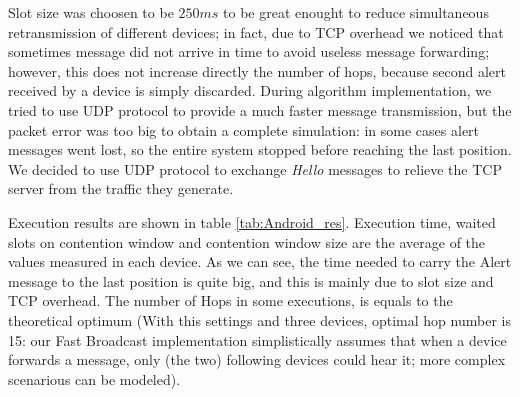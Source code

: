 Slot size was choosen to be $250ms$ to be great enought to reduce simultaneous retransmission of different devices; in fact, due to TCP overhead we noticed that sometimes message did not arrive in time to avoid useless message forwarding; however, this does not increase directly the number of hops, because second alert received by a device is simply discarded. 
During algorithm implementation, we tried to use UDP protocol to provide a much faster message transmission, but the packet error was too big to obtain a complete simulation: in some cases alert messages went lost, so the entire system stopped before reaching the last position. We decided to use UDP protocol to exchange \textit{Hello} messages to relieve the TCP server from the traffic they generate.

Execution results are shown in table \ref{tab:Android_res}. Execution time, waited slots on contention window and contention window size are the average of the values measured in each device. As we can see, the time needed to carry the Alert message to the last position is quite big, and this is mainly due to slot size and TCP overhead. The number of Hops in some executions, is equals to the theoretical optimum (With this settings and three devices, optimal hop number is 15: our Fast Broadcast implementation simplistically assumes that when a device forwards a message, only (the two) following devices could hear it; more complex scenarious can be modeled).

